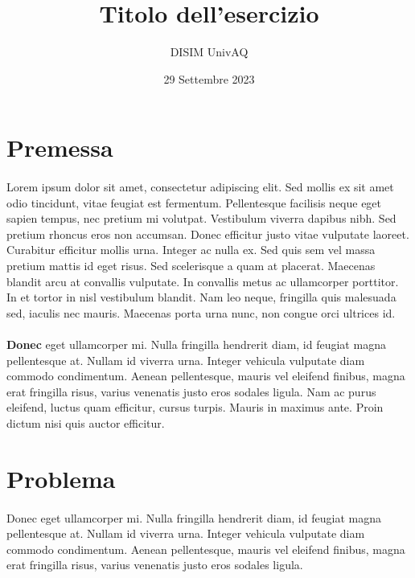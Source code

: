 \documentclass{article}
\title{Titolo dell'esercizio}
\author{DISIM UnivAQ}
\date{29 Settembre 2023}
\begin{document}
\maketitle
\thispagestyle{fancy}

\section*{Premessa}

\paragraph*{} Lorem ipsum dolor sit amet, consectetur adipiscing elit. Sed mollis ex sit amet odio tincidunt, vitae feugiat est fermentum. Pellentesque facilisis neque eget sapien tempus, nec pretium mi volutpat. Vestibulum viverra dapibus nibh. Sed pretium rhoncus eros non accumsan. Donec efficitur justo vitae vulputate laoreet. Curabitur efficitur mollis urna. Integer ac nulla ex. Sed quis sem vel massa pretium mattis id eget risus. Sed scelerisque a quam at placerat. Maecenas blandit arcu at convallis vulputate. In convallis metus ac ullamcorper porttitor. In et tortor in nisl vestibulum blandit. Nam leo neque, fringilla quis malesuada sed, iaculis nec mauris. Maecenas porta urna nunc, non congue orci ultrices id. 

\paragraph*{} \textbf{Donec} eget ullamcorper mi. Nulla fringilla hendrerit diam, id feugiat magna pellentesque at. Nullam id viverra urna. Integer vehicula vulputate diam commodo condimentum. Aenean pellentesque, mauris vel eleifend finibus, magna erat fringilla risus, varius venenatis justo eros sodales ligula. Nam ac purus eleifend, luctus quam efficitur, cursus turpis. Mauris in maximus ante. Proin dictum nisi quis auctor efficitur. 



\section*{Problema}

\paragraph*{} Donec eget ullamcorper mi. Nulla fringilla hendrerit diam, id feugiat magna pellentesque at. Nullam id viverra urna. Integer vehicula vulputate diam commodo condimentum. Aenean pellentesque, mauris vel eleifend finibus, magna erat fringilla risus, varius venenatis justo eros sodales ligula.
\end{document}
